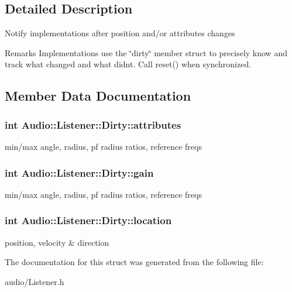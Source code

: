 \subsection{Detailed Description}
Notify implementations after position and/or attributes changes \begin{DoxyRemark}{Remarks}
Implementations use the \char`\"{}dirty\char`\"{} member struct to precisely know and track what changed and what didn\textquotesingle{}t. Call reset() when synchronized. 
\end{DoxyRemark}


\subsection{Member Data Documentation}
\subsubsection[{\texorpdfstring{attributes}{attributes}}]{\setlength{\rightskip}{0pt plus 5cm}int Audio\+::\+Listener\+::\+Dirty\+::attributes}\hypertarget{structAudio_1_1Listener_1_1Dirty_a1ad61f5193e118670c13eeaddb7de153}{}\label{structAudio_1_1Listener_1_1Dirty_a1ad61f5193e118670c13eeaddb7de153}
min/max angle, radius, pf radius ratios, reference freqs 
\subsubsection[{\texorpdfstring{gain}{gain}}]{\setlength{\rightskip}{0pt plus 5cm}int Audio\+::\+Listener\+::\+Dirty\+::gain}\hypertarget{structAudio_1_1Listener_1_1Dirty_a86c739a3691ef1610babb65c7963a234}{}\label{structAudio_1_1Listener_1_1Dirty_a86c739a3691ef1610babb65c7963a234}
min/max angle, radius, pf radius ratios, reference freqs 
\subsubsection[{\texorpdfstring{location}{location}}]{\setlength{\rightskip}{0pt plus 5cm}int Audio\+::\+Listener\+::\+Dirty\+::location}\hypertarget{structAudio_1_1Listener_1_1Dirty_a5d78bd7ab799bee823262ca6daa0d4b6}{}\label{structAudio_1_1Listener_1_1Dirty_a5d78bd7ab799bee823262ca6daa0d4b6}
position, velocity \& direction 

The documentation for this struct was generated from the following file\+:\begin{DoxyCompactItemize}
\item 
audio/Listener.\+h\end{DoxyCompactItemize}
